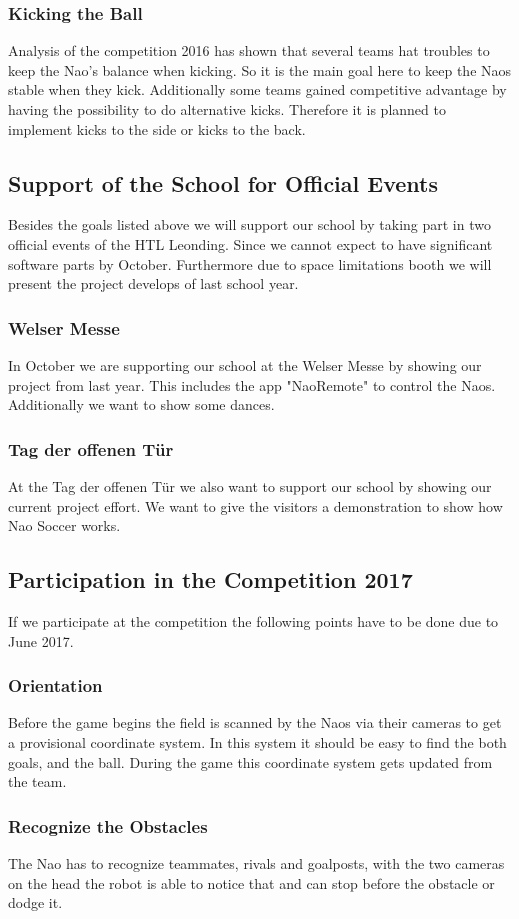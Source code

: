 \documentclass[12pt]{article}
\begin{document}
\subsubsection{Kicking the Ball}
Analysis of the competition 2016 has shown that several teams hat troubles to keep the Nao's balance when kicking. So it is the main goal here to keep the Naos stable when they kick. Additionally some teams gained competitive advantage by having the possibility to do alternative kicks. Therefore it is planned to implement kicks to the side or kicks to the back.
\pagebreak
\subsection{Support of the School for Official Events}
Besides the goals listed above we will support our school by taking part in two official events of the HTL Leonding. Since we cannot expect to have significant software parts by October. Furthermore due to space limitations booth we will present the project develops of last school year.
\subsubsection{Welser Messe}
In October we are supporting our school at the Welser Messe by showing our project from last year. This includes the app "NaoRemote" to control the Naos. Additionally we want to show some dances. 
\subsubsection{Tag der offenen Tür}
At the Tag der offenen Tür we also want to support our school by showing our current project effort. We want to give the visitors a demonstration to show how Nao Soccer works. 
\pagebreak
\subsection{Participation in the Competition 2017}
If we participate at the competition the following points have to be done due to June 2017.
\subsubsection{Orientation}
Before the game begins the field is scanned by the Naos via their cameras to get a provisional coordinate system. In this system it should be easy to find the both goals, and the ball. During the game this coordinate system gets updated from the team.
\subsubsection{Recognize the Obstacles}
The Nao has to recognize teammates, rivals and goalposts, with the two cameras on the head the robot is able to notice that and can stop before the obstacle or dodge it.
\end{document}
